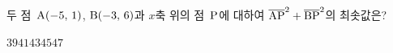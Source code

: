 두 점~$\mathrm{A}(-5,\,1)$, $\mathrm{B}(-3,\,6)$과 $x$축 위의 점~$\mathrm{P}$에 대하여 $\overline{\mathrm{AP}}^2+\overline{\mathrm{BP}}^2$의 최솟값은?
\begin{choices32}{$39$}{$41$}{$43$}{$45$}{$47$}\end{choices32}
